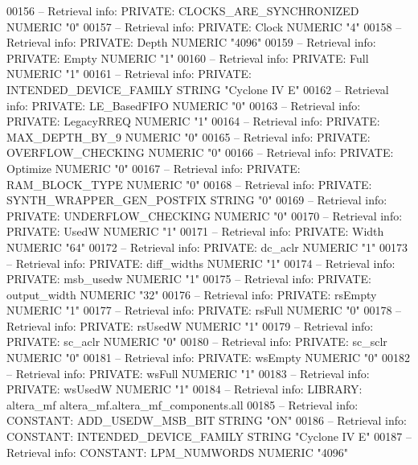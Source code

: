 \begin{DoxyCode}
{00156 \textcolor{keyword}{-- Retrieval info: PRIVATE: CLOCKS\_ARE\_SYNCHRONIZED NUMERIC "0"}
00157 \textcolor{keyword}{-- Retrieval info: PRIVATE: Clock NUMERIC "4"}
00158 \textcolor{keyword}{-- Retrieval info: PRIVATE: Depth NUMERIC "4096"}
00159 \textcolor{keyword}{-- Retrieval info: PRIVATE: Empty NUMERIC "1"}
00160 \textcolor{keyword}{-- Retrieval info: PRIVATE: Full NUMERIC "1"}
00161 \textcolor{keyword}{-- Retrieval info: PRIVATE: INTENDED\_DEVICE\_FAMILY STRING "Cyclone IV E"}
00162 \textcolor{keyword}{-- Retrieval info: PRIVATE: LE\_BasedFIFO NUMERIC "0"}
00163 \textcolor{keyword}{-- Retrieval info: PRIVATE: LegacyRREQ NUMERIC "1"}
00164 \textcolor{keyword}{-- Retrieval info: PRIVATE: MAX\_DEPTH\_BY\_9 NUMERIC "0"}
00165 \textcolor{keyword}{-- Retrieval info: PRIVATE: OVERFLOW\_CHECKING NUMERIC "0"}
00166 \textcolor{keyword}{-- Retrieval info: PRIVATE: Optimize NUMERIC "0"}
00167 \textcolor{keyword}{-- Retrieval info: PRIVATE: RAM\_BLOCK\_TYPE NUMERIC "0"}
00168 \textcolor{keyword}{-- Retrieval info: PRIVATE: SYNTH\_WRAPPER\_GEN\_POSTFIX STRING "0"}
00169 \textcolor{keyword}{-- Retrieval info: PRIVATE: UNDERFLOW\_CHECKING NUMERIC "0"}
00170 \textcolor{keyword}{-- Retrieval info: PRIVATE: UsedW NUMERIC "1"}
00171 \textcolor{keyword}{-- Retrieval info: PRIVATE: Width NUMERIC "64"}
00172 \textcolor{keyword}{-- Retrieval info: PRIVATE: dc\_aclr NUMERIC "1"}
00173 \textcolor{keyword}{-- Retrieval info: PRIVATE: diff\_widths NUMERIC "1"}
00174 \textcolor{keyword}{-- Retrieval info: PRIVATE: msb\_usedw NUMERIC "1"}
00175 \textcolor{keyword}{-- Retrieval info: PRIVATE: output\_width NUMERIC "32"}
00176 \textcolor{keyword}{-- Retrieval info: PRIVATE: rsEmpty NUMERIC "1"}
00177 \textcolor{keyword}{-- Retrieval info: PRIVATE: rsFull NUMERIC "0"}
00178 \textcolor{keyword}{-- Retrieval info: PRIVATE: rsUsedW NUMERIC "1"}
00179 \textcolor{keyword}{-- Retrieval info: PRIVATE: sc\_aclr NUMERIC "0"}
00180 \textcolor{keyword}{-- Retrieval info: PRIVATE: sc\_sclr NUMERIC "0"}
00181 \textcolor{keyword}{-- Retrieval info: PRIVATE: wsEmpty NUMERIC "0"}
00182 \textcolor{keyword}{-- Retrieval info: PRIVATE: wsFull NUMERIC "1"}
00183 \textcolor{keyword}{-- Retrieval info: PRIVATE: wsUsedW NUMERIC "1"}
00184 \textcolor{keyword}{-- Retrieval info: LIBRARY: altera\_mf altera\_mf.altera\_mf\_components.all}
00185 \textcolor{keyword}{-- Retrieval info: CONSTANT: ADD\_USEDW\_MSB\_BIT STRING "ON"}
00186 \textcolor{keyword}{-- Retrieval info: CONSTANT: INTENDED\_DEVICE\_FAMILY STRING "Cyclone IV E"}
00187 \textcolor{keyword}{-- Retrieval info: CONSTANT: LPM\_NUMWORDS NUMERIC "4096"}
}
\end{DoxyCode}
